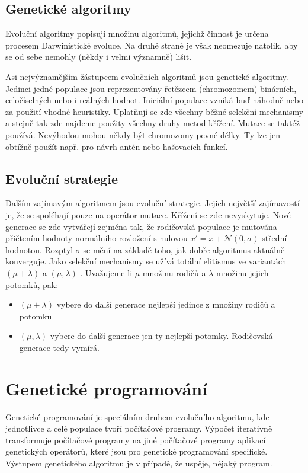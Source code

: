 \subsection{Genetické algoritmy}

Evoluční algoritmy popisují množinu algoritmů, jejichž činnost je určena procesem Darwinistické
evoluce. Na druhé straně je však neomezuje natolik, aby se od sebe nemohly (někdy i velmi
významně) lišit.

Asi nejvýznamějším žástupcem evolučních algoritmů jsou genetické algoritmy. Jedinci jedné populace
jsou reprezentovány řetězcem (chromozomem) binárních, celočíselných nebo i reálných hodnot.
Iniciální populace vzniká buď náhodně nebo za použití vhodné heuristiky. Uplatňují se zde všechny
běžné selekční mechanismy a stejně tak zde najdeme použity všechny druhy metod křížení.
Mutace se taktéž používá. Nevýhodou mohou někdy být chromozomy pevné délky. Ty lze jen obtížně
použít např. pro návrh antén nebo hašovacích funkcí. 

\subsection{Evoluční strategie}

Dalším zajímavým algoritmem jsou evoluční strategie. Jejich největší zajímavostí je, že
se spoléhají pouze na operátor mutace. Křížení se zde nevyskytuje. Nové generace se zde
vytvářejí zejména tak, že rodičovská populace je mutována přičtením hodnoty normálního rozložení s nulovou
$x' = x + \mathcal{N}(0, \sigma)$
střední hodnotou. Rozptyl $\sigma$ se mění na základě toho, jak dobře algoritmus aktuálně
konverguje. Jako selekční mechanismy se užívá totální elitismus ve variantách $(\mu + \lambda)$
a $(\mu, \lambda)$ \cite{ES}. Uvažujeme-li $\mu$ množinu rodičů a $\lambda$ množinu jejich
potomků, pak:

\begin{itemize}
	\item $(\mu + \lambda)$ vybere do další generace nejlepší jedince z množiny
		rodičů a potomku
	\item $(\mu, \lambda)$ vybere do další generace jen ty nejlepší potomky. Rodičovská
		generace tedy vymírá.
\end{itemize} 

\section{Genetické programování}
Genetické programování je speciálním druhem evolučního algoritmu, kde jednotlivce a 
celé populace tvoří počítačové programy. Výpočet iterativně transformuje počítačové
programy na jiné počítačové programy aplikací genetických operátorů, které jsou 
pro genetické programování specifické. Výstupem genetického algoritmu
je v případě, že uspěje, nějaký program. 

